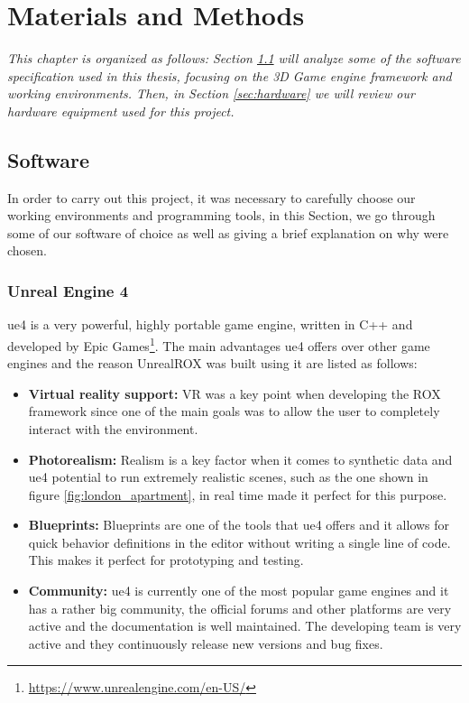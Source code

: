 
\chapter{Materials and Methods}
\label{metodologia}

\textit{This chapter is organized as follows: Section \ref{sec:software} will analyze some of the software specification used in this thesis, focusing on the 3D Game engine framework and working environments. Then, in Section \ref{sec:hardware} we will review our hardware equipment used for this project.}

\section{Software}
\label{sec:software}
In order to carry out this project, it was necessary to carefully choose our working environments and programming tools, in this Section, we go through some of our software of choice as well as giving a brief explanation on why were chosen.

\subsection{Unreal Engine 4}
\gls{ue4} is a very powerful, highly portable game engine, written in C++ and developed by Epic Games\footnote{\url{https://www.unrealengine.com/en-US/}}.
The main advantages \gls{ue4} offers over other game engines and the reason UnrealROX was built using it are listed as follows:

\begin{itemize}
	\item \textbf{Virtual reality support:} VR was a key point when developing the ROX framework since one of the main goals was to allow the user to completely interact with the environment.
	\item \textbf{Photorealism:} Realism is a key factor when it comes to synthetic data and \gls{ue4} potential to run extremely realistic scenes, such as the one shown in figure \ref{fig:london_apartment}, in real time made it perfect for this purpose.
	\item \textbf{Blueprints:} Blueprints are one of the tools that \gls{ue4} offers and it allows for quick behavior definitions in the editor without writing a single line of code. This makes it perfect for prototyping and testing.
	\item \textbf{Community:} \gls{ue4} is currently one of the most popular game engines and it has a rather big community, the official forums and other platforms are very active and the documentation is well maintained. The developing team is very active and they continuously release new versions and bug fixes. 
\end{itemize}

